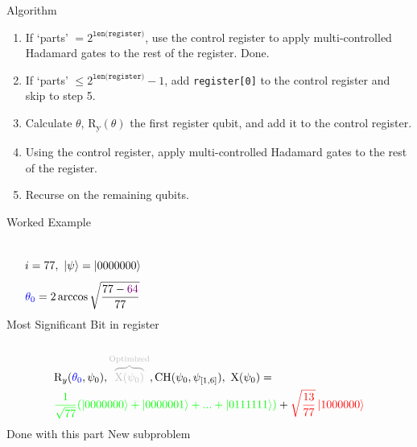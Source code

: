 \documentclass{beamer}
\begin{document}
  \begin{frame}{Algorithm}
  \begin{enumerate}
      \item If `parts' $= 2^\texttt{len(register)}$, use the control register to apply multi-controlled Hadamard gates to the rest of the register. Done.
      \item If `parts' $\leq 2^\texttt{len(register)}-1$, add \texttt{register[0]} to the control register and skip to step 5.
      \item Calculate $\theta$, R\textsubscript{y}$(\theta)$ the first register qubit, and add it to the control register.
      \item Using the control register, apply multi-controlled Hadamard gates to the rest of the register.
      \item Recurse on the remaining qubits. \\
  \end{enumerate}
  \end{frame}
  
  \begin{frame}{Worked Example}
    \begin{columns}
        $$i = 77, \ \ket{\psi} = \ket{0000000}$$
        $$\color{blue}\theta_0\color{black} = 2\arccos \sqrt{\frac{77-\color{violet}64}{77}}$$
        \color{violet} Most Significant Bit in register
    \end{columns}
    \begin{align*}
      &\text{R}_y(\color{blue}\theta_0\color{black}, \psi_0), \color{lightgray}\overbrace{\text{X}(\psi_0)}^{\text{Optimized}}\color{black}, \text{CH}(\psi_0, \psi_{[1,6]}), \ \text{X}(\psi_0) = \\
      &\color{green} \frac{1}{\sqrt{77}} (\ket{0000000} + \ket{0000001} + ... + \ket{0111111}) \color{black} + \color{red} \sqrt{\frac{13}{77}} \ket{1000000}
      \end{align*}
      \hspace{60} \color{green} Done with this part \hspace{70} \color{red} New subproblem
  \end{frame}
  
  
\end{document}
